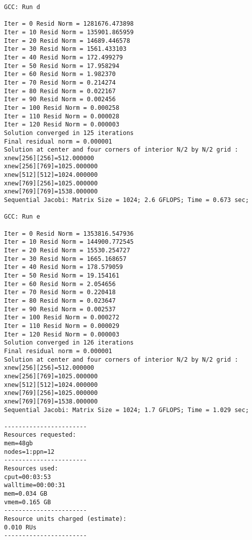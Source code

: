 \documentclass[11pt]{article}
\begin{document}
\begin{lstlisting}
GCC: Run d
 
Iter = 0 Resid Norm = 1281676.473898
Iter = 10 Resid Norm = 135901.865959
Iter = 20 Resid Norm = 14689.446578
Iter = 30 Resid Norm = 1561.433103
Iter = 40 Resid Norm = 172.499279
Iter = 50 Resid Norm = 17.958294
Iter = 60 Resid Norm = 1.982370
Iter = 70 Resid Norm = 0.214274
Iter = 80 Resid Norm = 0.022167
Iter = 90 Resid Norm = 0.002456
Iter = 100 Resid Norm = 0.000258
Iter = 110 Resid Norm = 0.000028
Iter = 120 Resid Norm = 0.000003
Solution converged in 125 iterations
Final residual norm = 0.000001
Solution at center and four corners of interior N/2 by N/2 grid : 
xnew[256][256]=512.000000
xnew[256][769]=1025.000000
xnew[512][512]=1024.000000
xnew[769][256]=1025.000000
xnew[769][769]=1538.000000
Sequential Jacobi: Matrix Size = 1024; 2.6 GFLOPS; Time = 0.673 sec; 
 
GCC: Run e
 
Iter = 0 Resid Norm = 1353816.547936
Iter = 10 Resid Norm = 144900.772545
Iter = 20 Resid Norm = 15530.254727
Iter = 30 Resid Norm = 1665.168657
Iter = 40 Resid Norm = 178.579059
Iter = 50 Resid Norm = 19.154161
Iter = 60 Resid Norm = 2.054656
Iter = 70 Resid Norm = 0.220418
Iter = 80 Resid Norm = 0.023647
Iter = 90 Resid Norm = 0.002537
Iter = 100 Resid Norm = 0.000272
Iter = 110 Resid Norm = 0.000029
Iter = 120 Resid Norm = 0.000003
Solution converged in 126 iterations
Final residual norm = 0.000001
Solution at center and four corners of interior N/2 by N/2 grid : 
xnew[256][256]=512.000000
xnew[256][769]=1025.000000
xnew[512][512]=1024.000000
xnew[769][256]=1025.000000
xnew[769][769]=1538.000000
Sequential Jacobi: Matrix Size = 1024; 1.7 GFLOPS; Time = 1.029 sec; 

-----------------------
Resources requested:
mem=48gb
nodes=1:ppn=12
-----------------------
Resources used:
cput=00:03:53
walltime=00:00:31
mem=0.034 GB
vmem=0.165 GB
-----------------------
Resource units charged (estimate):
0.010 RUs
-----------------------
\end{lstlisting}
\end{document}
